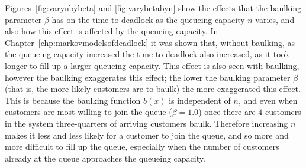 \documentclass{article}
\begin{document}
Figures~\ref{fig:varynbybeta} and \ref{fig:varybetabyn} show the effects that the baulking parameter $\beta$ has on the time to deadlock as the queueing capacity $n$ varies, and also how this effect is affected by the queueing capacity.
In Chapter~\ref{chp:markovmodelsofdeadlock} it was shown that, without baulking, as the queueing capacity increased the time to deadlock also increased, as it took longer to fill up a larger queueing capacity.
This effect is also seen with baulking, however the baulking exaggerates this effect; the lower the baulking parameter $\beta$ (that is, the more likely customers are to baulk) the more exaggerated this effect.
This is because the baulking function $b(x)$ is independent of $n$, and even when customers are most willing to join the queue ($\beta = 1.0$) once there are $4$ customers in the system three-quarters of arriving customers baulk.
Therefore increasing $n$ makes it less and less likely for a customer to join the queue, and so more and more difficult to fill up the queue, especially when the number of customers already at the queue approaches the queueing capacity.
\end{document}
